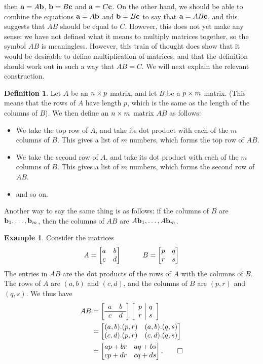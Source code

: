 \documentclass[a4paper]{book}
\theoremstyle{definition}
\newtheorem{definition}[theorem]{Definition}
\newtheorem{example}[theorem]{Example}
\begin{document}
then $\mathbf{a}=A\mathbf{b}$, $\mathbf{b}=B\mathbf{c}$ and $\mathbf{a}=C\mathbf{c}$.
On the other hand, we should be able to combine the equations
$\mathbf{a}=A\mathbf{b}$ and $\mathbf{b}=B\mathbf{c}$ to say that
$\mathbf{a}=AB\mathbf{c}$, and this suggests that $AB$ should be equal to
$C$.  However, this does not yet make any sense: we have not defined
what it means to multiply matrices together, so the symbol $AB$ is
meaningless.  However, this train of thought does show that it would
be desirable to define multiplication of matrices, and that the
definition should work out in such a way that $AB=C$.  We will next
explain the relevant construction.

\begin{definition}
 Let $A$ be an $n\times p$ matrix, and let $B$ be a $p\times m$ matrix.
 (This means that the rows of $A$ have length $p$, which is the same
 as the length of the columns of $B$).  We then define an $n\times m$
 matrix $AB$ as follows:
 \begin{itemize}
  \item We take the top row of $A$, and take its dot product with each
   of the $m$ columns of $B$.  This gives a list of $m$ numbers, which
   forms the top row of $AB$.
  \item We take the second row of $A$, and take its dot product with each
   of the $m$ columns of $B$.  This gives a list of $m$ numbers, which
   forms the second row of $AB$.
  \item and so on.
 \end{itemize}

 Another way to say the same thing is as follows: if the columns of
 $B$ are $\mathbf{b}_1,\dotsc,\mathbf{b}_m$, then the columns of $AB$ are
 $A\mathbf{b}_1,\dotsc,A\mathbf{b}_m$. 
\end{definition}
\begin{example}
 Consider the matrices
 \[ A = \begin{bmatrix} a & b \\ c & d \end{bmatrix} \hspace{3em}
    B = \begin{bmatrix} p & q \\ r & s \end{bmatrix}
 \]
 The entries in $AB$ are the dot products of the rows of $A$ with the
 columns of $B$.  The rows of $A$ are $(a,b)$ and $(c,d)$, and the
 columns of $B$ are $(p,r)$ and $(q,s)$.  We thus have
 \begin{align*}
  AB &=
     \left[\begin{array}{cc} a & b \\ \hline c & d \end{array}\right]
     \left[\begin{array}{c|c} p & q \\ r & s \end{array}\right] \\
  &= \begin{bmatrix} (a,b).(p,r) & (a,b).(q,s) \\
          (c,d).(p,r) & (c,d).(q,s) \end{bmatrix} \\
  &= \begin{bmatrix} ap+br & aq+bs \\ cp+dr & cq+ds \end{bmatrix}. \qed
 \end{align*}
\end{example}
\end{document}
